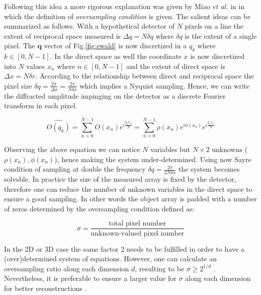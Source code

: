 Following this idea a more rigorous explanation was given by Miao \textit{et al.} in \cite{Miao1998} in which the 
definition of \textit{oversampling condition} is given. The salient ideas can be summarized as follows. 
With a hypothetical detector of $N$ pixels on a line the extent of reciprocal space measured is $\Delta q = N\delta q$ 
where $\delta q$ is the extent of a single pixel. The $\mathbf{q}$ vector of Fig.\ref{fig:ewald} is now discretized in 
a $q_k$ where $k \in [0,N-1]$. In the direct space as well the coordinate $x$ is now discretized into $N$ values 
$x_n$ where $n \in [0,N-1]$ and the extent of direct space is $\Delta x = N\delta r$. According to the relationship 
between direct and reciprocal space the pixel size $\delta q = \frac{2\pi}{\Delta x} = \frac{2\pi}{N \delta x}$ which 
implies a Nyquist sampling.
Hence, we can write the diffracted amplitude impinging on the detector as a discrete Fourier transform in each pixel. 

\begin{equation}
    \widehat{O(q_k)} = \sum_{n = 0}^{N-1}O(x_n)e^{ i \frac{q_{k} r_{n}}{N}} = \sum_{n = 0}^{N-1}\rho(x_n)e^{ i \phi(x_n)}e^{ i \frac{q_{k} r_{n}}{N}} 
\end{equation}

Observing the above equation we can notice $N$ variables but $N\times 2$ unknowns ($\rho(x_n), \phi(x_n)$), hence 
making the system under-determined. Using now Sayre condition of sampling at double the frequency $\delta q = \frac{2\pi}{2 N \delta x}$ 
the system becomes solvable. 
In practice the size of the measured array is fixed by the detector, therefore one can reduce the number of unknown 
variables in the direct space to ensure a good sampling. In other words the object array is padded with a number of zeros 
determined by the oversampling condition defined as: 

\begin{equation}
    \sigma = \frac{\text{total pixel number}}{\text{unknown-valued pixel number}}
\end{equation}

In the 2D or 3D case the same factor 2 needs to be fulfilled in order to have a (over)determined system of equations. However,
one can calculate an oversampling ratio along each dimension $d$, resulting to be $\sigma \ge 2^{1/d}$ \cite{Latychevskaia:18}. 
Nevertheless, it is preferable to ensure a larger value for $\sigma$ along each dimension for better reconstructions \cite{Veen_2004}. \\

